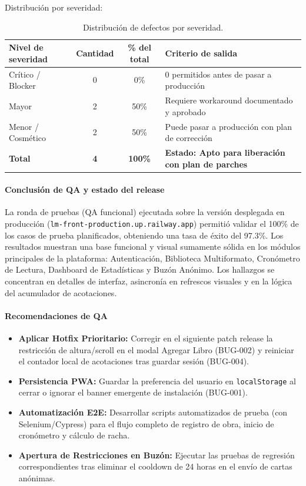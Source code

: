 \documentclass[12pt, atypical, journal]{article}
\begin{document}
Distribución por severidad:
\begin{table}[H]
\centering
\small
\renewcommand{\arraystretch}{1.2}
\begin{tabular}{|l|c|c|p{5.5cm}|}
\hline
\textbf{Nivel de severidad} & \textbf{Cantidad} & \textbf{\% del total} & \textbf{Criterio de salida} \\ \hline
Crítico / Blocker & 0 & 0\% & 0 permitidos antes de pasar a producción \\ \hline
Mayor & 2 & 50\% & Requiere workaround documentado y aprobado \\ \hline
Menor / Cosmético & 2 & 50\% & Puede pasar a producción con plan de corrección \\ \hline
\textbf{Total} & \textbf{4} & \textbf{100\%} & \textbf{Estado: Apto para liberación con plan de parches} \\ \hline
\end{tabular}
\caption{Distribución de defectos por severidad.}
\label{tab:defectos_severidad}
\end{table}

\paragraph{Conclusión de QA y estado del release}
La ronda de pruebas (QA funcional) ejecutada sobre la versión desplegada en producción (\texttt{lm-front-production.up.railway.app}) permitió validar el 100\% de los casos de prueba planificados, obteniendo una tasa de éxito del 97.3\%. Los resultados muestran una base funcional y visual sumamente sólida en los módulos principales de la plataforma: Autenticación, Biblioteca Multiformato, Cronómetro de Lectura, Dashboard de Estadísticas y Buzón Anónimo. Los hallazgos se concentran en detalles de interfaz, asincronía en refrescos visuales y en la lógica del acumulador de acotaciones.

\paragraph{Recomendaciones de QA}
\begin{itemize}
    \item \textbf{Aplicar Hotfix Prioritario:} Corregir en el siguiente patch release la restricción de altura/scroll en el modal Agregar Libro (BUG-002) y reiniciar el contador local de acotaciones tras guardar sesión (BUG-004).
    \item \textbf{Persistencia PWA:} Guardar la preferencia del usuario en \texttt{localStorage} al cerrar o ignorar el banner emergente de instalación (BUG-001).
    \item \textbf{Automatización E2E:} Desarrollar scripts automatizados de prueba (con Selenium/Cypress) para el flujo completo de registro de obra, inicio de cronómetro y cálculo de racha.
    \item \textbf{Apertura de Restricciones en Buzón:} Ejecutar las pruebas de regresión correspondientes tras eliminar el cooldown de 24 horas en el envío de cartas anónimas.
\end{itemize}
\end{document}
